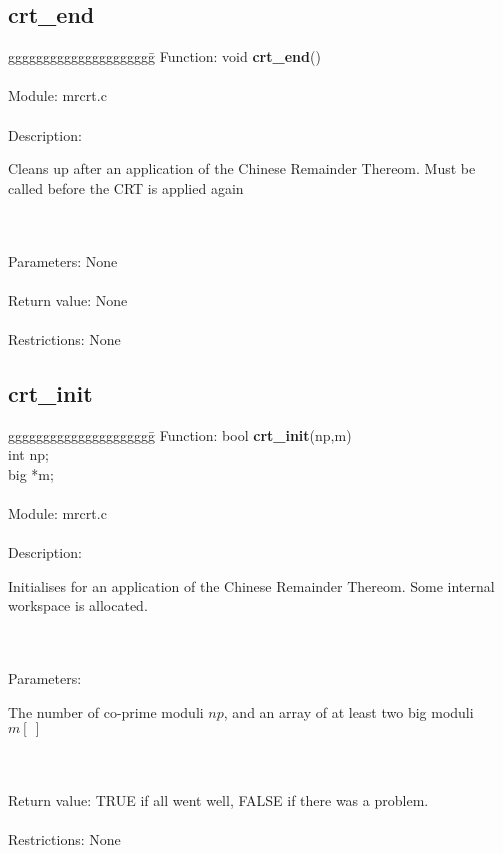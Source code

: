 \subsection{crt\_end}
\begin{tabbing}
ggggggggggggggggggggg\= \kill
      Function:      \>void {\bf crt\_end}() \\
      \ \\
      Module:        \>mrcrt.c \\
      \ \\
      Description:   \>
                     \parbox[t]{3 in}
                     {Cleans up after an application of the Chinese Remainder
                      Thereom. Must be called before the CRT is applied again} \\
      \ \\
      Parameters:    \>None \\
      \ \\
      Return value:  \>None \\
      \ \\
      Restrictions:  \>None \\
\end{tabbing}
      
\pagebreak
\subsection{crt\_init}
\begin{tabbing}
ggggggggggggggggggggg\= \kill
      Function:      \>bool {\bf crt\_init}(np,m) \\
                     \>int np; \\
                     \>big *m; \\
      \ \\
      Module:        \>mrcrt.c \\
      \ \\
      Description:   \>
                     \parbox[t]{3 in}
                     {Initialises for an application of the Chinese Remainder
                      Thereom. Some internal workspace is allocated.} \\
      \ \\
      Parameters:    \>
                     \parbox[t]{3 in}
                     {The number of co-prime moduli $np$, and an array of
                      at least two big moduli $m[\ ]$} \\
      \ \\
      Return value:  \>TRUE if all went well, FALSE if there was a problem. \\
      \ \\
      Restrictions:  \>None \\
\end{tabbing}
